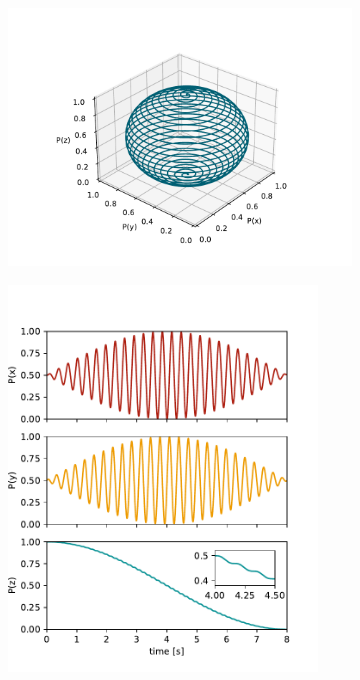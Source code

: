 \begin{figure}
\begin{subfigure}{.55\textwidth} 
  \centering
  \includegraphics[width=\textwidth]{figures/rabi_linear.pdf}
\end{subfigure}%
\begin{subfigure}{.45\textwidth}
  \centering
  \includegraphics[width=0.9\textwidth]{figures/rabi_linear_px_py_pz.pdf}

\end{subfigure}
\end{figure}
